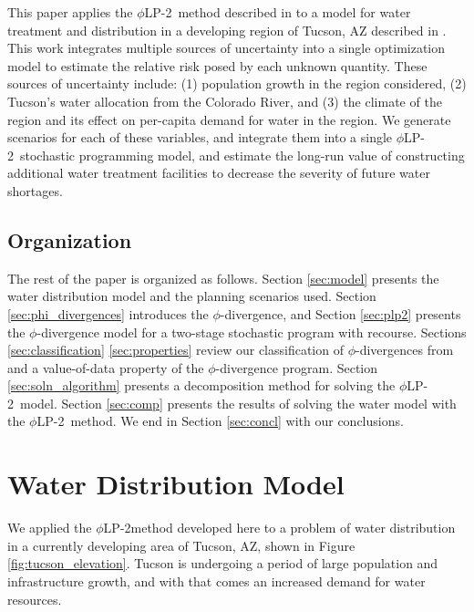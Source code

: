 \documentclass[opre,nonblindrev]{informs3} %
\newcommand{\plp}{$\phi$LP-2}
\begin{document}
This paper applies the \plp\ method described in \cite{love2013phi} to a model for water treatment and distribution in a developing region of Tucson, AZ described in \cite{???}.
This work integrates multiple sources of uncertainty into a single optimization model to estimate the relative risk posed by each unknown quantity.
These sources of uncertainty include: (1) population growth in the region considered, (2) Tucson's water allocation from the Colorado River, and (3) the climate of the region and its effect on per-capita demand for water in the region.
We generate scenarios for each of these variables, and integrate them into a single \plp\ stochastic programming model, and estimate the long-run value of constructing additional water treatment facilities to decrease the severity of future water shortages.

\subsection{Organization}

The rest of the paper is organized as follows.
Section \ref{sec:model} presents the water distribution model and the planning scenarios used.
Section \ref{sec:phi_divergences} introduces the $\phi$-divergence, and Section \ref{sec:plp2} presents the $\phi$-divergence model for a two-stage stochastic program with recourse.
Sections \ref{sec:classification} \ref{sec:properties} review our classification of $\phi$-divergences from \cite{love2013phi} and a value-of-data property of the $\phi$-divergence program.
Section \ref{sec:soln_algorithm} presents a decomposition method for solving the \plp\ model.
Section \ref{sec:comp} presents the results of solving the water model with the \plp\ method.
We end in Section \ref{sec:concl} with our conclusions.



\section{Water Distribution Model}
\label{sec:water}

We applied the \plp method developed here to a problem of water distribution in a currently developing area of Tucson, AZ, shown in Figure \ref{fig:tucson_elevation}.
Tucson is undergoing a period of large population and infrastructure growth, and with that comes an increased demand for water resources.
\end{document}
